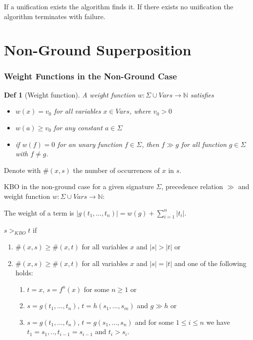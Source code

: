 \documentclass[]{article}
\newtheorem*{definition*}{Def}
\begin{document}
If a unification exists the algorithm finds it. If there exists no unification the algorithm terminates with failure.

\section{Non-Ground Superposition}

\subsubsection{Weight Functions in the Non-Ground Case}

\begin{definition*}[Weight function]
	A weight function $w:\Sigma \cup Vars \rightarrow \mathbb{N}$ satisfies
	\begin{itemize}
		\item $w(x) = v_0$ for all variables $x \in Vars$, where $v_0 > 0$
		\item $w(a) \geq v_0$ for any constant $a \in \Sigma$
		\item if $w(f)=0$ for an unary function $f \in \Sigma$, then $f \gg g$ for all function $g \in \Sigma$ with $f\not= g$.
	\end{itemize}
\end{definition*}

Denote with $\#(x,s)$ the number of occurrences of $x$ in $s$.

KBO in the non-ground case for a given signature $\Sigma$, precedence relation $\gg$ and weight function $w:\Sigma \cup Vars \rightarrow \mathbb{N}$:

The weight of a term is $|g(t_1,...,t_n)| = w(g) + \sum_{i=1}^{n}|t_i|$.

$s >_{KBO} t$ if
\begin{enumerate}
	\item $\#(x,s) \geq \#(x,t)$ for all variables $x$ and $|s|>|t|$ or
	\item $\#(x,s) \geq \#(x,t)$ for all variables $x$ and $|s|=|t|$ and one of the following holds:
	\begin{enumerate}
		\item $t=x$, $s=f^n(x)$ for some $n\geq 1$ or
		\item $s=g(t_1,...,t_n)$, $t=h(s_1,...,s_m)$ and $g \gg h$ or
		\item $s=g(t_1,...,t_n)$, $t=g(s_1,...,s_n)$ and for some $1\leq i \leq n$ we have $t_1=s_1,.., t_{i-1}=s_{i-1}$ and $t_i > s_i$.
	\end{enumerate}
\end{enumerate}
\end{document}

